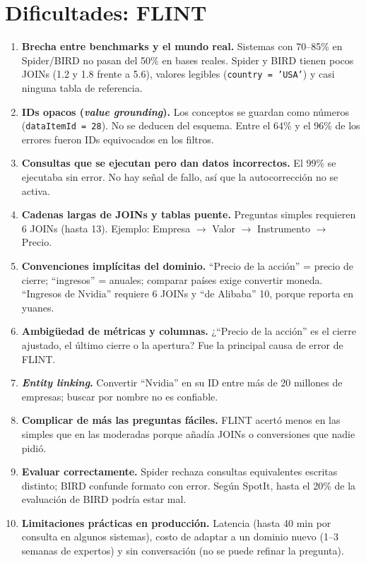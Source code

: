 \documentclass[11pt,a4paper]{article}
\begin{document}
\section{Dificultades: FLINT}
\begin{enumerate}
  \item \textbf{Brecha entre benchmarks y el mundo real.} Sistemas con 70--85\% en Spider/BIRD no pasan del 50\% en bases reales. Spider y BIRD tienen pocos JOINs (1.2 y 1.8 frente a 5.6), valores legibles (\texttt{country = 'USA'}) y casi ninguna tabla de referencia.
  \item \textbf{IDs opacos (\textit{value grounding}).} Los conceptos se guardan como números (\texttt{dataItemId = 28}). No se deducen del esquema. Entre el 64\% y el 96\% de los errores fueron IDs equivocados en los filtros.
  \item \textbf{Consultas que se ejecutan pero dan datos incorrectos.} El 99\% se ejecutaba sin error. No hay señal de fallo, así que la autocorrección no se activa.
  \item \textbf{Cadenas largas de JOINs y tablas puente.} Preguntas simples requieren 6 JOINs (hasta 13). Ejemplo: Empresa $\rightarrow$ Valor $\rightarrow$ Instrumento $\rightarrow$ Precio.
  \item \textbf{Convenciones implícitas del dominio.} ``Precio de la acción'' = precio de cierre; ``ingresos'' = anuales; comparar países exige convertir moneda. ``Ingresos de Nvidia'' requiere 6 JOINs y ``de Alibaba'' 10, porque reporta en yuanes.
  \item \textbf{Ambigüedad de métricas y columnas.} ¿``Precio de la acción'' es el cierre ajustado, el último cierre o la apertura? Fue la principal causa de error de FLINT.
  \item \textbf{\textit{Entity linking}.} Convertir ``Nvidia'' en su ID entre más de 20 millones de empresas; buscar por nombre no es confiable.
  \item \textbf{Complicar de más las preguntas fáciles.} FLINT acertó menos en las simples que en las moderadas porque añadía JOINs o conversiones que nadie pidió.
  \item \textbf{Evaluar correctamente.} Spider rechaza consultas equivalentes escritas distinto; BIRD confunde formato con error. Según SpotIt, hasta el 20\% de la evaluación de BIRD podría estar mal.
  \item \textbf{Limitaciones prácticas en producción.} Latencia (hasta 40 min por consulta en algunos sistemas), costo de adaptar a un dominio nuevo (1--3 semanas de expertos) y sin conversación (no se puede refinar la pregunta).
\end{enumerate}
\end{document}
